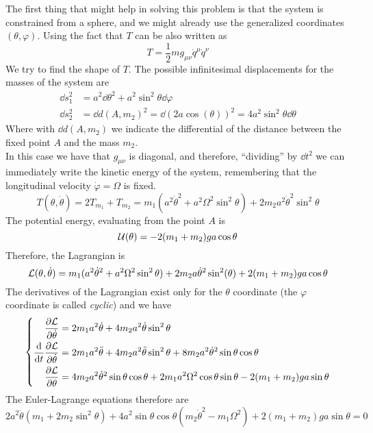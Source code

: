 \documentclass[../admech.tex]{subfiles}
\begin{document}
\begin{exe}
	The first thing that might help in solving this problem is that the system is constrained from a sphere, and we might already use the generalized coordinates $(\theta,\varphi)$. Using the fact that $T$ can be also written as
	\begin{equation*}
		T=\frac{1}{2}mg_{\mu\nu}\dot{q}^\mu\dot{q}^\nu
	\end{equation*}
	We try to find the shape of $T$. The possible infinitesimal displacements for the masses of the system are
	\begin{equation}
		\begin{aligned}
			\dd{s}^2_1&=a^2\dd{\theta}^2+a^2\sin^2\theta\dd{\varphi}\\
			\dd{s}^2_2&=\dd{d(A,m_2)}^2=\dd{(2a\cos(\theta))}^2=4a^2\sin^2\theta\dd\theta
		\end{aligned}
		\label{eq:infdisp}
	\end{equation}
	Where with $\dd{d(A,m_2)}$ we indicate the differential of the distance between the fixed point $A$ and the mass $m_2$.\\
	In this case we have that $g_{\mu\nu}$ is diagonal, and therefore, ``dividing'' by $\dd{t}^2$ we can immediately write the kinetic energy of the system, remembering that the longitudinal velocity $\dot{\varphi}=\Omega$ is fixed.
	\begin{equation}
		T(\theta,\dot{\theta})=2T_{m_1}+T_{m_2}=m_1(a^2\dot{\theta}^2+a^2\Omega^2\sin^2\theta)+2m_2a^2\dot{\theta}^2\sin^2\theta
		\label{eq:kinenmonster}
	\end{equation}
	The potential energy, evaluating from the point $A$ is
	\begin{equation}
		\mathcal{U}(\theta)=-2(m_1+m_2)ga\cos\theta
		\label{eq:potenmonster}
	\end{equation}
	Therefore, the Lagrangian is
	\begin{equation}
		\mathcal{L}(\theta,\dot{\theta})=m_1(a^2\dot{\theta}^2+a^2\Omega^2\sin^2\theta)+2m_2a\dot{\theta}^2\sin^2(\theta)+2(m_1+m_2)ga\cos\theta
		\label{eq:lagmonster}
	\end{equation}
	The derivatives of the Lagrangian exist only for the $\theta$ coordinate (the $\varphi$ coordinate is called \emph{cyclic}) and we have
	\begin{equation}
		\left\{ \begin{aligned}
				\pdv{\mathcal{L}}{\dot{\theta}}&=2m_1a^2\dot{\theta}+4m_2a^2\dot{\theta}\sin^2\theta\\
				\dv{t}\pdv{\mathcal{L}}{\dot{\theta}}&=2m_1a^2\ddot{\theta}+4m_2a^2\ddot{\theta}\sin^2\theta+8m_2a^2\dot{\theta}^2\sin\theta\cos\theta\\
				\pdv{\mathcal{L}}{\theta}&=4m_2a^2\dot{\theta}^2\sin\theta\cos\theta+2m_1a^2\Omega^2\cos\theta\sin\theta-2(m_1+m_2)ga\sin\theta
		\end{aligned}\right.
		\label{eq:lagdermonster}
	\end{equation}
	The Euler-Lagrange equations therefore are
	\begin{equation}
		2a^2\ddot{\theta}(m_1+2m_2\sin^2\theta)+4a^2\sin\theta\cos\theta(m_2\dot{\theta}^2-m_1\Omega^2)+2(m_1+m_2)ga\sin\theta=0
		\label{eq:elmonster}
	\end{equation}
\end{exe}
\end{document}
